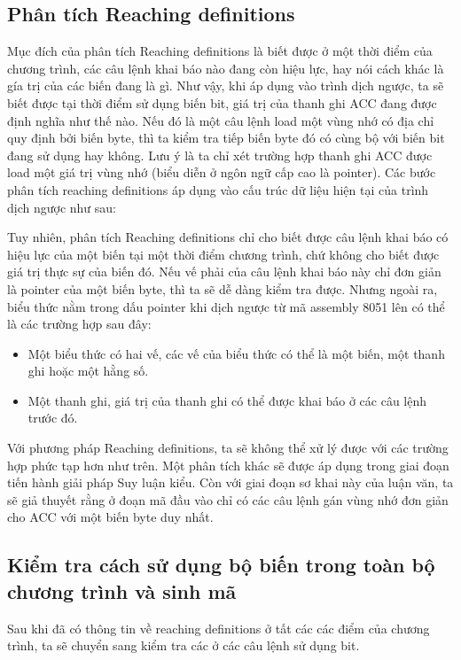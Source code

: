 \subsection{Phân tích Reaching definitions}

Mục đích của phân tích Reaching definitions là biết được ở một thời điểm của chương trình, các câu lệnh khai báo nào đang còn hiệu lực, hay nói cách khác là gía trị của các biến đang là gì.
Như vậy, khi áp dụng vào trình dịch ngược, ta sẽ biết được tại thời điểm sử dụng biến bit, giá trị của thanh ghi ACC đang được định nghĩa như thế nào. Nếu đó là một câu lệnh load một vùng nhớ có địa chỉ quy định bởi biến byte, thì ta kiểm tra tiếp biến byte đó có cùng bộ với biến bit đang sử dụng hay không. Lưu ý là ta chỉ xét trường hợp thanh ghi ACC được load một giá trị vùng nhớ (biểu diễn ở ngôn ngữ cấp cao là pointer).
Các bước phân tích reaching definitions áp dụng vào cấu trúc dữ liệu hiện tại của trình dịch ngược như sau:

Tuy nhiên, phân tích Reaching definitions chỉ cho biết được câu lệnh khai báo có hiệu lực của một biến tại một thời điểm chương trình, chứ không cho biết được giá trị thực sự của biến đó. Nếu vế phải của câu lệnh khai báo này chỉ đơn giản là pointer của một biến byte, thì ta sẽ dễ dàng kiểm tra được. Nhưng ngoài ra, biểu thức nằm trong dấu pointer khi dịch ngược từ mã assembly 8051 lên có thể là các trường hợp sau đây:
\begin{itemize}
	\item Một biểu thức có hai vế, các vế của biểu thức có thể là một biến, một thanh ghi hoặc một hằng số.
	\item Một thanh ghi, giá trị của thanh ghi có thể được khai báo ở các câu lệnh trước đó.
\end{itemize}
Với phương pháp Reaching definitions, ta sẽ không thể xử lý được với các trường hợp phức tạp hơn như trên.  Một phân tích khác sẽ được áp dụng trong giai đoạn tiến hành giải pháp Suy luận kiểu. Còn với giai đoạn sơ khai này của luận văn, ta sẽ giả thuyết rằng ở đoạn mã đầu vào chỉ có các câu lệnh gán vùng nhớ đơn giản cho ACC với một biến byte duy nhất.
\subsection{Kiểm tra cách sử dụng bộ biến trong toàn bộ chương trình và sinh mã}

Sau khi đã có thông tin về reaching definitions ở tất các các điểm của chương trình, ta sẽ chuyển sang kiểm tra các ở các câu lệnh sử dụng bit.

